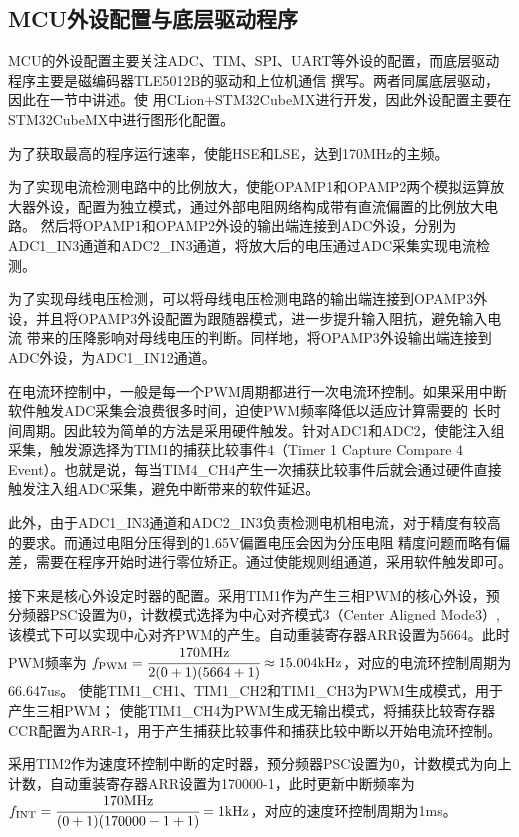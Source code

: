\subsection{MCU外设配置与底层驱动程序}

MCU的外设配置主要关注ADC、TIM、SPI、UART等外设的配置，而底层驱动程序主要是磁编码器TLE5012B的驱动和上位机通信
撰写。两者同属底层驱动，因此在一节中讲述。使
用CLion+STM32CubeMX进行开发，因此外设配置主要在STM32CubeMX中进行图形化配置。

为了获取最高的程序运行速率，使能HSE和LSE，达到170MHz的主频。

为了实现电流检测电路中的比例放大，使能OPAMP1和OPAMP2两个模拟运算放大器外设，配置为独立模式，通过外部电阻网络构成带有直流偏置的比例放大电路。
然后将OPAMP1和OPAMP2外设的输出端连接到ADC外设，分别为ADC1\_IN3通道和ADC2\_IN3通道，将放大后的电压通过ADC采集实现电流检测。

为了实现母线电压检测，可以将母线电压检测电路的输出端连接到OPAMP3外设，并且将OPAMP3外设配置为跟随器模式，进一步提升输入阻抗，避免输入电流
带来的压降影响对母线电压的判断。同样地，将OPAMP3外设输出端连接到ADC外设，为ADC1\_IN12通道。

在电流环控制中，一般是每一个PWM周期都进行一次电流环控制。如果采用中断软件触发ADC采集会浪费很多时间，迫使PWM频率降低以适应计算需要的
长时间周期。因此较为简单的方法是采用硬件触发。针对ADC1和ADC2，使能注入组采集，触发源选择为TIM1的捕获比较事件4（Timer 1 Capture Compare
4 Event）。也就是说，每当TIM4\_CH4产生一次捕获比较事件后就会通过硬件直接触发注入组ADC采集，避免中断带来的软件延迟。

此外，由于ADC1\_IN3通道和ADC2\_IN3负责检测电机相电流，对于精度有较高的要求。而通过电阻分压得到的1.65V偏置电压会因为分压电阻
精度问题而略有偏差，需要在程序开始时进行零位矫正。通过使能规则组通道，采用软件触发即可。

接下来是核心外设定时器的配置。采用TIM1作为产生三相PWM的核心外设，预分频器PSC设置为0，计数模式选择为中心对齐模式3（Center Aligned Mode3）,
该模式下可以实现中心对齐PWM的产生。自动重装寄存器ARR设置为5664。此时PWM频率为
\(f_{\mathrm{PWM}}=\cfrac{170\mathrm{MHz}}{2(0+1)(5664+1)}\approx 15.004\mathrm{kHz}\)，对应的电流环控制周期为66.647us。
使能TIM1\_CH1、TIM1\_CH2和TIM1\_CH3为PWM生成模式，用于产生三相PWM；
使能TIM1\_CH4为PWM生成无输出模式，将捕获比较寄存器CCR配置为ARR-1，用于产生捕获比较事件和捕获比较中断以开始电流环控制。

采用TIM2作为速度环控制中断的定时器，预分频器PSC设置为0，计数模式为向上计数，自动重装寄存器ARR设置为170000-1，此时更新中断频率为
\(f_{\mathrm{INT}}=\cfrac{170\mathrm{MHz}}{(0+1)(170000-1+1)}= 1\mathrm{kHz}\)，对应的速度环控制周期为1ms。

